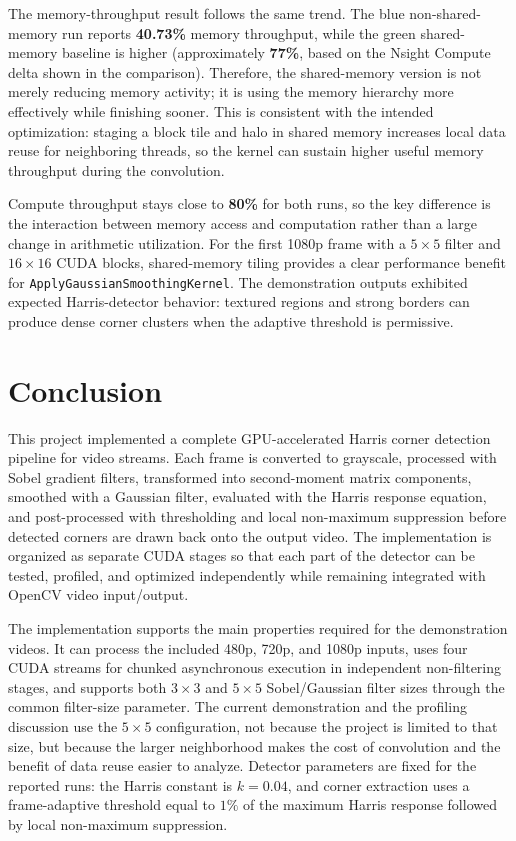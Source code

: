 \documentclass[conference]{IEEEtran}
\begin{document}
The memory-throughput result follows the same trend. The blue non-shared-memory run reports \textbf{40.73\%} memory throughput, while the green shared-memory baseline is higher (approximately \textbf{77\%}, based on the Nsight Compute delta shown in the comparison). Therefore, the shared-memory version is not merely reducing memory activity; it is using the memory hierarchy more effectively while finishing sooner. This is consistent with the intended optimization: staging a block tile and halo in shared memory increases local data reuse for neighboring threads, so the kernel can sustain higher useful memory throughput during the convolution.

Compute throughput stays close to \textbf{80\%} for both runs, so the key difference is the interaction between memory access and computation rather than a large change in arithmetic utilization. For the first 1080p frame with a $5\times5$ filter and $16\times16$ CUDA blocks, shared-memory tiling provides a clear performance benefit for \texttt{ApplyGaussianSmoothingKernel}. The demonstration outputs exhibited expected Harris-detector behavior: textured regions and strong borders can produce dense corner clusters when the adaptive threshold is permissive.

\section{Conclusion}
This project implemented a complete GPU-accelerated Harris corner detection pipeline for video streams. Each frame is converted to grayscale, processed with Sobel gradient filters, transformed into second-moment matrix components, smoothed with a Gaussian filter, evaluated with the Harris response equation, and post-processed with thresholding and local non-maximum suppression before detected corners are drawn back onto the output video. The implementation is organized as separate CUDA stages so that each part of the detector can be tested, profiled, and optimized independently while remaining integrated with OpenCV video input/output.

The implementation supports the main properties required for the demonstration videos. It can process the included 480p, 720p, and 1080p inputs, uses four CUDA streams for chunked asynchronous execution in independent non-filtering stages, and supports both $3\times3$ and $5\times5$ Sobel/Gaussian filter sizes through the common filter-size parameter. The current demonstration and the profiling discussion use the $5\times5$ configuration, not because the project is limited to that size, but because the larger neighborhood makes the cost of convolution and the benefit of data reuse easier to analyze. Detector parameters are fixed for the reported runs: the Harris constant is $k=0.04$, and corner extraction uses a frame-adaptive threshold equal to $1\%$ of the maximum Harris response followed by local non-maximum suppression.
\end{document}
